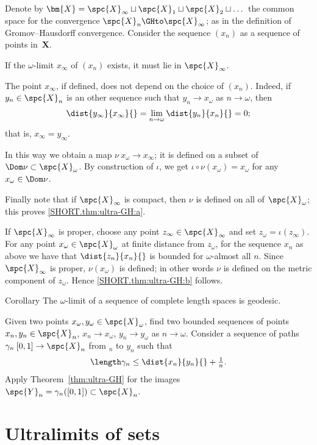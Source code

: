 Denote by $\bm{X}=\spc{X}_\infty\sqcup\spc{X}_1\sqcup\spc{X}_2\sqcup\dots$ the common space for the convergence $\spc{X}_n\GHto \spc{X}_\infty$;
as in the definition of Gromov--Hausdorff convergence.
Consider the sequence $(x_n)$ 
as a sequence of points in~$\bm{X}$.

If the $\omega$-limit $x_\infty$ of $(x_n)$ exists, 
it must lie in $\spc{X}_\infty$. 

The point $x_\infty$, if defined, does not depend on the choice of $(x_n)$.
Indeed, if $y_n\in\spc{X}_n$ is an other sequence such that $y_n\to x_\omega$ as $n\to\omega$, then 
\[
\dist{y_\infty}{x_\infty}{}=\lim_{n\to\omega}\dist{y_n}{x_n}{}=0;
\]
that is, $x_\infty=y_\infty$.


In this way we obtain a map $\nu\:x_\omega\to x_\infty$;
it is defined on a subset of $\Dom\nu \subset\spc{X}_\omega$.
By construction of $\iota$, 
we get  $\iota\circ\nu(x_\omega)=x_\omega$ for any $x_\omega\in \Dom\nu$.

Finally note that if $\spc{X}_\infty$ is compact, then $\nu$ is defined on all of $\spc{X}_\omega$;
this proves \ref{SHORT.thm:ultra-GH:a}.

If $\spc{X}_\infty$ is proper, choose any point $z_\infty\in \spc{X}_\infty$
and set $z_\omega=\iota(z_\infty)$.
For any point $x_\omega\in \spc{X}_\omega$ at finite distance from $z_\omega$,
for the sequence $x_n$ 
as above we have that $\dist{z_n}{x_n}{}$ is bounded for $\omega$-almost all $n$.
Since $\spc{X}_\infty$ is proper, $\nu(x_\omega)$ is defined;
in other words $\nu$ is defined on the metric component of $z_\omega$.
Hence \ref{SHORT.thm:ultra-GH:b} follows.
\qeds

\begin{thm}{Corollary} 
\label{cor:ulara-geod}
The $\omega$-limit of a sequence of complete length spaces is geodesic.
\end{thm}

 Given two points $x_\omega,y_\omega\in \spc{X}_\omega$, find two bounded sequences of points $x_n,y_n\in \spc{X}_n$, $x_n\to x_\omega$, $y_n\to y_\omega$ as $n\to\omega$.
Consider a sequence of paths  $\gamma_n\:[0,1]\to \spc{X}_n$ from $_n$ to $y_n$
 such that 
\[\length\gamma_n\le \dist{x_n}{y_n}{}+\tfrac{1}{n}.\]
Apply Theorem~\ref{thm:ultra-GH} 
for the images $\spc{Y}_n=\gamma_n([0,1])\subset \spc{X}_n$.
\qeds

\section{Ultralimits of sets}

